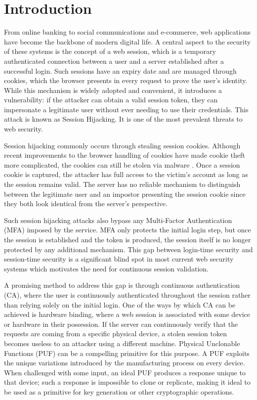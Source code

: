 

\chapter{Introduction}
\label{chapter:introduction}
From online banking to social communications and e-commerce, web applications have become the backbone of modern digital life. A central aspect to the security of these systems is the concept of a web session, which is a temporary authenticated connection between a user and a server established after a successful login. Such sessions have an expiry date and are managed through cookies, which the browser presents in every request to prove the user's identity. While this mechanism is widely adopted and convenient, it introduces a vulnerability: if the attacker can obtain a valid session token, they can impersonate a legitimate user without ever needing to use their credentials. This attack is known as Session Hijacking. It is one of the most prevalent threats to web security. 

Session hijacking commonly occurs through stealing session cookies. Although recent improvements to the browser handling of cookies have made cookie theft more complicated, the cookies can still be stolen via malware \cite{shen2021phishing}. Once a session cookie is captured, the attacker has full access to the victim's account as long as the session remains valid. The server has no reliable mechanism to distinguish between the legitimate user and an impostor presenting the session cookie since they both look identical from the server's perspective.

Such session hijacking attacks also bypass any Multi-Factor Authentication (MFA) imposed by the service. MFA only protects the initial login step, but once the session is established and the token is produced, the session itself is no longer protected by any additional mechanism. This gap between login-time security and session-time security is a significant blind spot in most current web security systems which motivates the need for continuous session validation.

A promising method to address this gap is through continuous authentication (CA), where the user is continuously authenticated throughout the session rather than relying solely on the initial login. One of the ways by which CA can be achieved is hardware binding, where a web session is associated with some device or hardware in their possession. If the server can continuously verify that the requests are coming from a specific physical device, a stolen session token becomes useless to an attacker using a different machine. Physical Unclonable Functions (PUF) can be a compelling primitive for this purpose. A PUF exploits the unique variations introduced by the manufacturing process on every device. When challenged with some input, an ideal PUF produces a response unique to that device; such a response is impossible to clone or replicate, making it ideal to be used as a primitive for key generation or other cryptographic operations.


